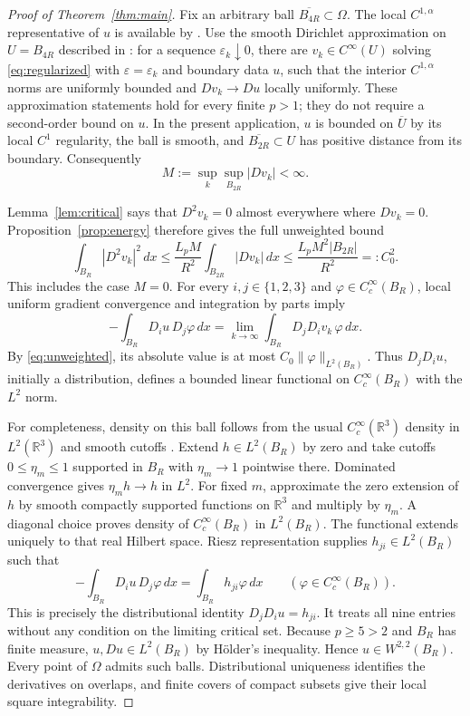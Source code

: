 \documentclass[11pt]{article}
\theoremstyle{remark}
\newcommand{\R}{\mathbb R}
\newcommand{\dd}{\,dx}
\newcommand{\eps}{\varepsilon}
\begin{document}
\begin{proof}[Proof of Theorem~\ref{thm:main}]
Fix an arbitrary ball $\overline{B_{4R}}\subset\Omega$.
The local $C^{1,\alpha}$ representative of $u$ is available
by \cite[Section 4]{Lindqvist}. Use the smooth Dirichlet
approximation on $U=B_{4R}$ described in
\cite[Section 3, (3.2)--(3.4)]{Sarsa}: for a sequence
$\eps_k\downarrow0$, there are $v_k\in C^\infty(U)$ solving
\eqref{eq:regularized} with $\eps=\eps_k$ and boundary data $u$,
such that the interior $C^{1,\alpha}$ norms are uniformly
bounded and $Dv_k\to Du$ locally uniformly.
These approximation statements hold for every finite $p>1$;
they do not require a second-order bound on $u$.
In the present application, $u$ is bounded on $\overline U$
by its local $C^1$ regularity, the ball is smooth, and
$\overline{B_{2R}}\subset U$ has positive distance from its boundary.
Consequently
\[
 M:=\sup_k\sup_{B_{2R}}|Dv_k|<\infty.
\]

Lemma~\ref{lem:critical} says that $D^2v_k=0$ almost everywhere
where $Dv_k=0$. Proposition~\ref{prop:energy} therefore gives
the full unweighted bound
\begin{equation}\label{eq:unweighted}
 \int_{B_R}|D^2v_k|^2\dd
 \leq\frac{L_pM}{R^2}\int_{B_{2R}}|Dv_k|\dd
 \leq\frac{L_pM^2|B_{2R}|}{R^2}=:C_0^2.
\end{equation}
This includes the case $M=0$.
For every $i,j\in\{1,2,3\}$ and
$\varphi\in C_c^\infty(B_R)$, local uniform gradient convergence
and integration by parts imply
\[
 -\int_{B_R}D_i u\,D_j\varphi\dd
   =\lim_{k\to\infty}\int_{B_R}D_jD_i v_k\,\varphi\dd.
\]
By \eqref{eq:unweighted}, its absolute value is at most
$C_0\|\varphi\|_{L^2(B_R)}$. Thus $D_jD_i u$, initially a
distribution, defines a bounded linear functional on
$C_c^\infty(B_R)$ with the $L^2$ norm.

For completeness, density on this ball follows from the usual
$C_c^\infty(\R^3)$ density in $L^2(\R^3)$ and smooth cutoffs
\cite[Exercise 1.13.1(iii)--(iv)]{TaoEpsilon}.
Extend $h\in L^2(B_R)$ by zero and take cutoffs
$0\leq\eta_m\leq1$ supported in $B_R$ with
$\eta_m\to1$ pointwise there. Dominated convergence gives
$\eta_mh\to h$ in $L^2$. For fixed $m$, approximate the zero
extension of $h$ by smooth compactly supported functions on
$\R^3$ and multiply by $\eta_m$. A diagonal choice proves
density of $C_c^\infty(B_R)$ in $L^2(B_R)$.
The functional extends uniquely to that real Hilbert space.
Riesz representation \cite[Theorem 1.4.13]{TaoEpsilon} supplies
$h_{ji}\in L^2(B_R)$ such that
\[
 -\int_{B_R}D_i u\,D_j\varphi\dd
   =\int_{B_R}h_{ji}\varphi\dd
   \qquad(\varphi\in C_c^\infty(B_R)).
\]
This is precisely the distributional identity $D_jD_i u=h_{ji}$.
It treats all nine entries without any condition on the
limiting critical set. Because $p\geq5>2$ and $B_R$ has finite
measure, $u,Du\in L^2(B_R)$ by H\"older's inequality.
Hence $u\in W^{2,2}(B_R)$.
Every point of $\Omega$ admits such balls. Distributional
uniqueness identifies the derivatives on overlaps, and finite
covers of compact subsets give their local square integrability.
\end{proof}
\end{document}
